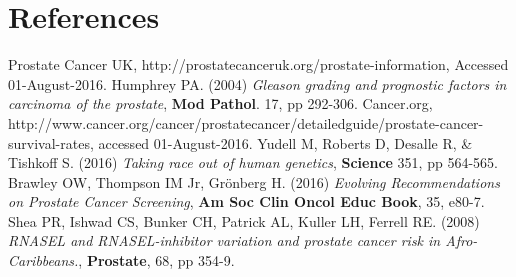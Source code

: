 \documentclass[final]{article}
\begin{document}
\section{References}

\begin{thebibliography}{1}
    Prostate Cancer UK,
    http://prostatecanceruk.org/prostate-information,
    Accessed 01-August-2016.
    Humphrey PA.
    (2004)
    \emph{Gleason grading and prognostic factors in carcinoma of the prostate},
    \textbf{Mod Pathol}.
    17,
    pp 292-306.
    Cancer.org,
    http://www.cancer.org/cancer/prostatecancer/detailedguide/prostate-cancer-survival-rates,
    accessed 01-August-2016.
    Yudell M, Roberts D, Desalle R, \& Tishkoff S.
    (2016)
    \emph{Taking race out of human genetics},
    \textbf{Science}
    351,
    pp 564-565.
    Brawley OW, Thompson IM Jr, Grönberg H.
    (2016)
    \emph{Evolving Recommendations on Prostate Cancer Screening},
    \textbf{Am Soc Clin Oncol Educ Book},
    35,
    e80-7.
    Shea PR, Ishwad CS, Bunker CH, Patrick AL, Kuller LH, Ferrell RE.
    (2008)
    \emph{RNASEL and RNASEL-inhibitor variation and prostate cancer risk in Afro-Caribbeans.},
    \textbf{Prostate},
    68,
    pp 354-9.

\end{thebibliography}
\end{document}
